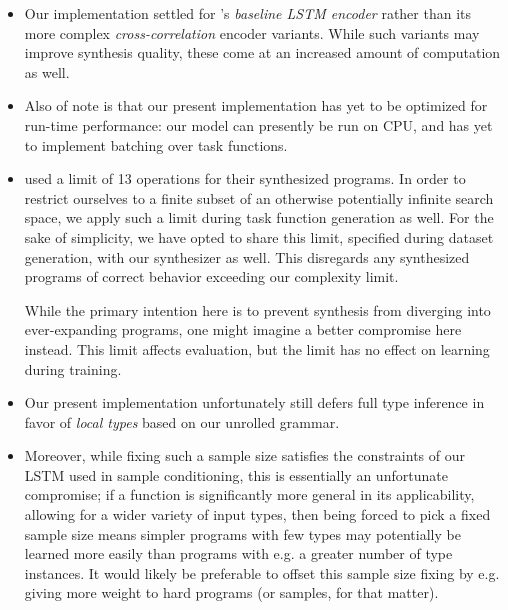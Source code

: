 \documentclass{article}
\begin{document}
\begin{itemize}
    \item Our implementation settled for \citet{nsps}'s \emph{baseline LSTM encoder} rather than its more complex \emph{cross-correlation} encoder variants.
    While such variants may improve synthesis quality,
    these come at an increased amount of computation as well.

    \item Also of note is that our present implementation has yet to be optimized for run-time performance:
    our model can presently be run on CPU,
    and has yet to implement batching over task functions.

    \item \citet{nsps} used a limit of 13 operations for their synthesized programs.
    In order to restrict ourselves to a finite subset of an otherwise potentially infinite search space,
    we apply such a limit during task function generation as well.
    For the sake of simplicity, we have opted to share this limit,
    specified during dataset generation, with our synthesizer as well.
    This disregards any synthesized programs of
    correct behavior exceeding our complexity limit.

    While the primary intention here is to prevent synthesis
    from diverging into ever-expanding programs,
    one might imagine a better compromise here instead.
    This limit affects evaluation,
    but the limit has no effect on learning during training.

    \item Our present implementation unfortunately still defers full type inference in favor of \emph{local types} based on our unrolled grammar.

    \item Moreover, while fixing such a sample size satisfies the constraints of our LSTM used in sample conditioning,
    this is essentially an unfortunate compromise;
    if a function is significantly more general in its applicability,
    allowing for a wider variety of input types,
    then being forced to pick a fixed sample size means simpler programs with few types may potentially be learned more easily than programs with e.g. a greater number of type instances.
    It would likely be preferable to offset this sample size fixing by e.g. giving more weight to hard programs (or samples, for that matter).

\end{itemize}
\end{document}
